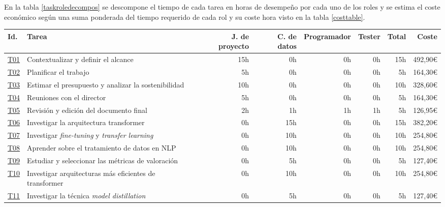 En la tabla \ref{taskroledecompos} se descompone el tiempo de cada tarea en horas de desempeño por
cada uno de los roles y se estima el coste económico según una suma ponderada del
tiempo requerido de cada rol y su coste hora visto en la tabla \ref{costtable}.


\begin{landscape}
    \begin{table}
    \centering
    \begin{tabular}{  l  l  r  r  r  r  r  r  }
        Id. & Tarea & J. de proyecto & C. de datos & Programador & Tester & \textbf{Total} & \textbf{Coste} \\
        \hline
        \hyperref[T01]{T01} & Contextualizar y definir el alcance & 15h & 0h & 0h & 0h & 15h & 492,90\euro\\
        \hline
        \hyperref[T02]{T02} & Planificar el trabajo & 5h & 0h & 0h & 0h & 5h & 164,30\euro\\
        \hline
        \hyperref[T03]{T03} & Estimar el presupuesto y analizar la sostenibilidad & 10h & 0h & 0h & 0h & 10h & 328,60\euro\\
        \hline
        \hyperref[T04]{T04} & Reuniones con el director & 5h & 0h & 0h & 0h & 5h & 164,30\euro\\
        \hline
        \hyperref[T05]{T05} & Revisión y edición del documento final & 2h & 1h & 1h & 1h & 5h & 126,95\euro\\
        \hline
        \hyperref[T06]{T06} & Investigar la arquitectura transformer & 0h & 15h & 0h & 0h & 15h & 382,20\euro\\
        \hline
        \hyperref[T07]{T07} & Investigar \textit{fine-tuning} y \textit{transfer learning} & 0h & 10h & 0h & 0h & 10h & 254,80\euro\\
        \hline
        \hyperref[T08]{T08} & Aprender sobre el tratamiento de datos en NLP & 0h & 10h & 0h & 0h & 10h & 254,80\euro\\
        \hline
        \hyperref[T09]{T09} & Estudiar y seleccionar las métricas de valoración & 0h & 5h & 0h & 0h & 5h & 127,40\euro\\
        \hline
        \hyperref[T10]{T10} & Investigar arquitecturas más eficientes de transformer & 0h & 10h & 0h & 0h & 10h & 254,80\euro\\
        \hline
        \hyperref[T11]{T11} & Investigar la técnica \textit{model distillation} & 0h & 5h & 0h & 0h & 5h & 127,40\euro\\

\end{tabular}
\end{table}
\end{landscape}
